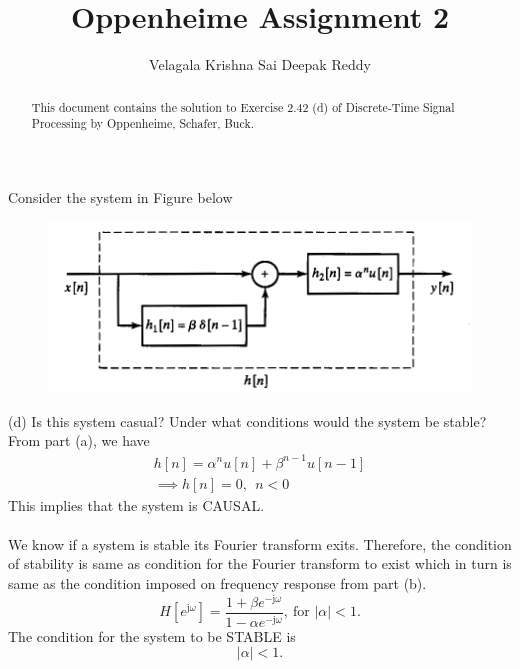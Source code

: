 \documentclass[journal,12pt,twocolumn]{IEEEtran}
\renewcommand\thesection{\arabic{section}}
\begin{document}


\title{Oppenheime Assignment 2}
\author{Velagala Krishna Sai Deepak Reddy}
\maketitle
\bigskip


\begin{abstract}
     This document contains the solution to Exercise 2.42 (d) of Discrete-Time Signal Processing by Oppenheime, Schafer, Buck.
\end{abstract}


\problem Consider the system in Figure below
\begin{figure}[!htb]
    \includegraphics[width=\columnwidth]{figs/plot.png}
    \label{fig: system}
\end{figure}

(d) Is this system casual? Under what conditions would the system be stable?
\\
\solution
From part (a), we have
\begin{align}
    h[n] = \alpha^n u[n] + \beta^{n-1} u[n-1] \\
    \implies h[n] = 0, \ \  n < 0
\end{align}
This implies that the system is CAUSAL.
\\ \\
We know if a system is stable its Fourier transform exits.
Therefore, the condition of stability is same as condition for the Fourier transform to exist which in turn is same as the condition imposed on frequency response from part (b).
\begin{equation}
    H[e^{\text{j}\omega}] = \frac{1 + \beta e^{-\text{j}\omega}}{1 - \alpha e^{-\text{j}\omega}}, \ \text{for } |\alpha| < 1.
\end{equation}
The condition for the system to be STABLE is 
\begin{equation}
    |\alpha| < 1.
\end{equation}
\end{document}
